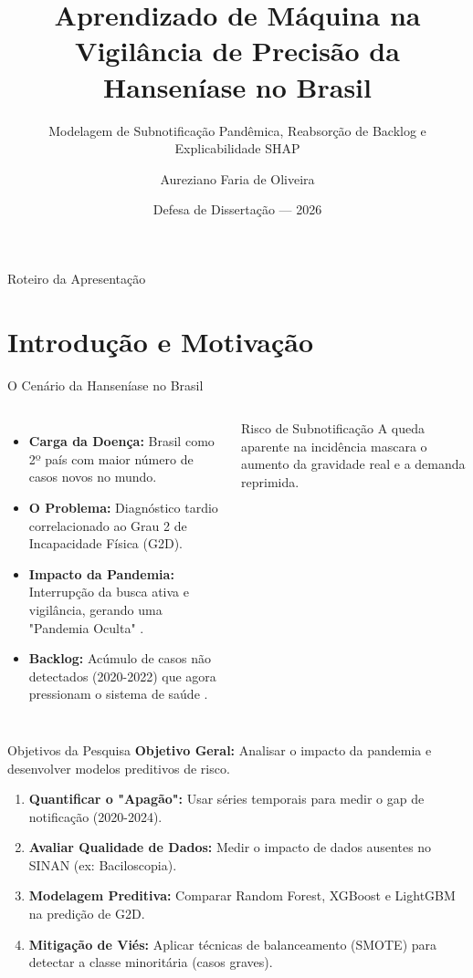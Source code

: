 \documentclass[10pt, aspectratio=169]{beamer}
\title{Aprendizado de Máquina na Vigilância de Precisão da Hanseníase no Brasil}
\subtitle{Modelagem de Subnotificação Pandêmica, Reabsorção de Backlog e Explicabilidade SHAP}
\author{Aureziano Faria de Oliveira}
\institute[UFES]{Programa de Pós-Graduação em Informática \\ Universidade Federal do Espírito Santo (UFES)}
\date{Defesa de Dissertação --- 2026}
\begin{document}
\begin{frame}
    \titlepage
\end{frame}

\begin{frame}{Roteiro da Apresentação}
    \tableofcontents
\end{frame}

\section{Introdução e Motivação}

\begin{frame}{O Cenário da Hanseníase no Brasil}
    \begin{columns}
        \begin{itemize}
            \item \textbf{Carga da Doença:} Brasil como 2º país com maior número de casos novos no mundo.
            \item \textbf{O Problema:} Diagnóstico tardio correlacionado ao Grau 2 de Incapacidade Física (G2D).
            \item \textbf{Impacto da Pandemia:} Interrupção da busca ativa e vigilância, gerando uma "Pandemia Oculta" \citep{who_hans_2021}.
            \item \textbf{Backlog:} Acúmulo de casos não detectados (2020-2022) que agora pressionam o sistema de saúde \citep{dahbeer2022impact}.
        \end{itemize}
        
        \begin{alertblock}{Risco de Subnotificação}
            A queda aparente na incidência mascara o aumento da gravidade real e a demanda reprimida.
        \end{alertblock}
    \end{columns}
\end{frame}

\begin{frame}{Objetivos da Pesquisa}
    \textbf{Objetivo Geral:} Analisar o impacto da pandemia e desenvolver modelos preditivos de risco.
    \vspace{0.5cm}
    \begin{enumerate}
        \item \textbf{Quantificar o "Apagão":} Usar séries temporais para medir o gap de notificação (2020-2024).
        \item \textbf{Avaliar Qualidade de Dados:} Medir o impacto de dados ausentes no SINAN (ex: Baciloscopia).
        \item \textbf{Modelagem Preditiva:} Comparar Random Forest, XGBoost e LightGBM na predição de G2D.
        \item \textbf{Mitigação de Viés:} Aplicar técnicas de balanceamento (SMOTE) para detectar a classe minoritária (casos graves).
    \end{enumerate}
\end{frame}
\end{document}
